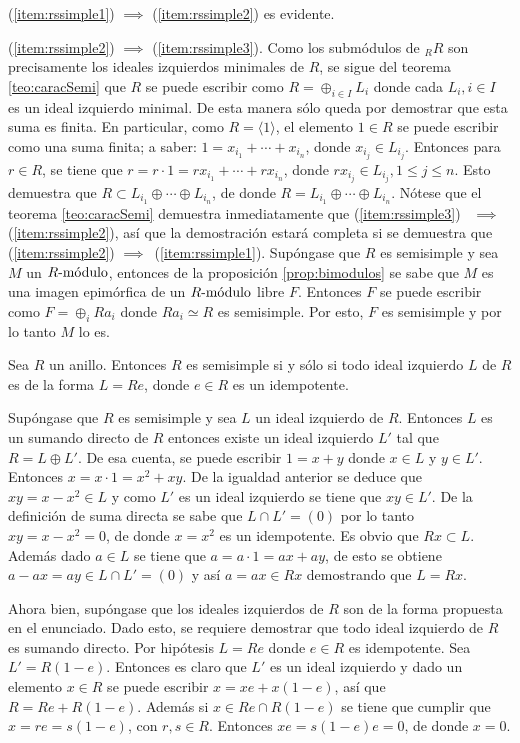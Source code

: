 \begin{proof*}
(\ref{item:rssimple1}) $\implies$ (\ref{item:rssimple2}) es evidente.

(\ref{item:rssimple2}) $\implies$ (\ref{item:rssimple3}). Como los submódulos de $_RR$ son precisamente los ideales izquierdos minimales de $R$, se sigue del teorema \ref{teo:caracSemi} que $R$ se puede escribir como $R = \oplus_{i \in I}L_i$ donde cada $L_i, i \in I$ es un ideal izquierdo minimal. De esta manera sólo queda por demostrar que esta suma es finita.
En particular, como $R = \langle 1 \rangle$, el elemento $1 \in R$ se puede escribir como una suma finita; a saber: $1 = x_{i_1} + \cdots + x_{i_n}$, donde $x_{i_j} \in L_{i_j}$. Entonces para $r \in R$, se tiene que $r = r \cdot 1 = rx_{i_1} + \cdots +rx_{i_n}$, donde $rx_{i_j} \in L_{i_j}, 1\leq j \leq n$. Esto demuestra que $R \subset L_{i_1} \oplus \cdots \oplus L_{i_n}$, de donde $R = L_{i_1} \oplus \cdots \oplus L_{i_n}$.
Nótese que el teorema \ref{teo:caracSemi} demuestra inmediatamente que (\ref{item:rssimple3})~ $\implies$(\ref{item:rssimple2}), así que la demostración estará completa si se demuestra que (\ref{item:rssimple2}) $\implies$~(\ref{item:rssimple1}). 
Supóngase que $R$ es semisimple y sea $M$ un $\modulo{R}$, entonces de la proposición \ref{prop:bimodulos} se sabe que $M$ es una imagen epimórfica de un $\modulo{R}$ libre $F$. Entonces $F$ se puede escribir como $F = \oplus_{i}Ra_i$ donde $Ra_i \simeq R$ es semisimple. Por esto, $F$ es semisimple y por lo tanto $M$ lo es. 
\end{proof*}
\begin{teorema}\label{teo:idealIdem}
Sea $R$ un anillo. Entonces $R$ es semisimple si y sólo si todo ideal izquierdo $L$ de $R$ es de la forma $L = Re$, donde $e \in R$ es un idempotente.
\end{teorema}
\begin{proof*}
Supóngase que $R$ es semisimple y sea $L$ un ideal  izquierdo de $R$. Entonces $L$ es un sumando directo de $R$ entonces existe un ideal izquierdo $L'$ tal que $R = L \oplus L'$. De esa cuenta, se puede escribir $1 = x + y$ donde $x \in L$ y $y \in L'$. Entonces $x = x \cdot 1 = x^2 + xy$. De la igualdad anterior se deduce que $xy = x - x^2 \in L$ y como $L'$ es un ideal izquierdo se tiene que $xy \in L'$. De la definición de suma directa se sabe que $L \cap L' = (0)$ por lo tanto $xy = x - x^2 = 0$, de donde $x = x^2$ es un idempotente. Es obvio que $Rx \subset L$. Además dado $a  \in L$ se tiene que $a = a \cdot 1 = ax + ay$, de esto se obtiene $a -ax = ay\in L\cap L'=(0)$ y así $a = ax \in Rx$ demostrando que $L = Rx$. 

Ahora bien, supóngase que los ideales izquierdos de $R$ son de la forma propuesta en el enunciado. Dado esto, se requiere demostrar que todo ideal izquierdo de $R$ es sumando directo. Por hipótesis $L = Re$ donde $e \in R$ es idempotente. Sea $L'= R(1-e)$. Entonces es claro que $L'$ es un ideal izquierdo y dado un elemento $x \in R$ se puede escribir $x = xe + x(1-e)$, así que $R = Re + R(1-e)$. Además si $x \in Re \cap R(1-e)$ se tiene que cumplir que $x = re = s(1-e)$, con $r,s \in R$. Entonces $xe = s(1-e)e = 0$, de donde $x = 0$.  
\end{proof*}
